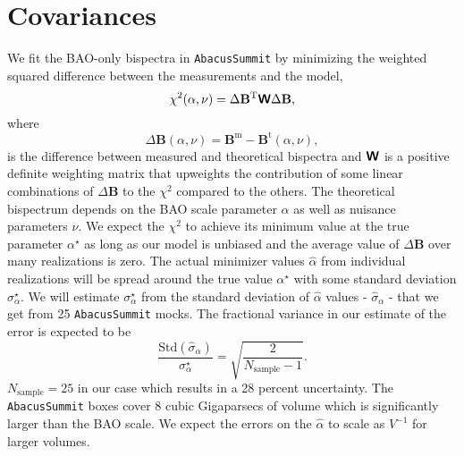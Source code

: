 \section{Covariances}
\label{sec:covariances}

We fit the BAO-only bispectra in \texttt{AbacusSummit} by minimizing the weighted squared difference between the measurements and the model, 
\begin{equation}
\label{eq:weightedsum}
    \chi^2(\alpha, \nu) = \Delta  \mathbf{B}^\mathrm{T} \textbf{\textsf{W}}\Delta \mathbf{B},
\end{equation}
where 
\begin{equation}
    \Delta  \mathbf{B}(\alpha, \nu) = \mathbf{B}^\mathrm{m} - \mathbf{B}^\mathrm{t}(\alpha, \nu),
\end{equation}
is the difference between measured and theoretical bispectra and $\textbf{\textsf{W}}$ is a positive definite weighting matrix that upweights the contribution of some linear combinations of $\Delta  \mathbf{B}$ to the $\chi^2$ compared to the others. The theoretical bispectrum depends on the BAO scale parameter $\alpha$ as well as nuisance parameters $\nu$. We expect the $\chi^2$ to achieve its minimum value at the true parameter $\alpha^\star$ as long as our model is unbiased and the average value of $\Delta  \mathbf{B}$ over many realizations is zero. The actual minimizer values $\widehat{\alpha}$ from individual realizations will be spread around the true value $\alpha^\star$ with some standard deviation $\sigma_\alpha^\star$. We will estimate $\sigma_\alpha^\star$ from the standard deviation of $\widehat{\alpha}$ values - $\widehat{\sigma}_\alpha$ - that we get from 25 \texttt{AbacusSummit} mocks. The fractional variance in our estimate of the error is expected to be
\begin{equation}
\label{eq:samplevariance}
    \frac{\mathrm{Std}(\widehat{\sigma}_\alpha)}{\sigma_\alpha^\star} = \sqrt{\frac{2}{N_\mathrm{sample}-1}}.
\end{equation}
$N_\mathrm{sample} = 25$ in our case which results in a 28 percent uncertainty. The \texttt{AbacusSummit} boxes cover 8 cubic Gigaparsecs of volume which is significantly larger than the BAO scale. We expect the errors on the $\widehat\alpha$ to scale as $V^{-1}$ for larger volumes. 

